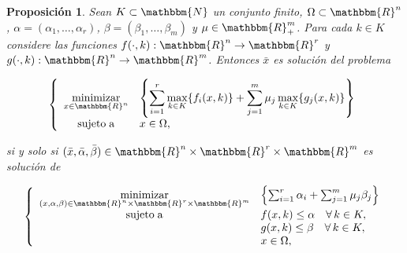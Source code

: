 \documentclass[a4paper,12pt]{report}
\newcommand{\RR}{\mathbbm{R}}
\newcommand{\NN}{\mathbbm{N}}
\newcommand{\Rn}{\RR^n}
\newcommand{\Rm}{\RR^m}
\newcommand{\bx}{\bar{x}}
\newcommand{\arr}{\rightarrow}
\newtheorem{prop}[teo]{Proposici\'on}
\begin{document}
\begin{prop}\label{propvar}
Sean $K\subset\NN$ un conjunto finito, $\Omega\subset\Rn$, $\alpha=(\alpha_1,\ldots,\alpha_r)$, $\beta=(\beta_1,\ldots,\beta_m)$ y $\mu\in\Rm_+$. Para cada $k\in K$ considere las funciones \linebreak $f(\cdot,k):\Rn\arr\RR^r$ y $g(\cdot,k):\Rn\arr\Rm$. Entonces $\bx$ es soluci\'on del problema


\begin{equation}\label{P1}
\left\{ 
\begin{array}{cl}
\displaystyle  \mathop{\mathrm{minimizar}}_{x\in\Rn}&\left\{\displaystyle{\sum_{i=1}^r\max_{k\in K}\{f_i(x,k)\}+\sum_{j=1}^m\mu_j\max_{k\in K}\{g_j(x,k)\}}\right\}\\
  \mathrm{sujeto\;a}& x\in\Omega,
 \end{array}
\right.
\end{equation}


si y solo si $(\bx,\bar{\alpha},\bar{\beta})\in\RR^n\times\RR^r\times\RR^m$ es soluci\'on de


\begin{equation}\label{P2}
\left\{
 \begin{array}{cl}
 \displaystyle\mathop{\mathrm{minimizar}}_{(x,\alpha,\beta)\in\Rn\times\RR^r\times\Rm} &\left\{\sum_{i=1}^r\alpha_i+\sum_{j=1}^m\mu_j\beta_j\right\}\\
  \mathrm{sujeto\;a}& f(x,k)\leq\alpha\quad\forall\,k\in K,\\
  	&	g(x,k)\leq \beta\quad\forall\,k\in K,\\
	&  x\in\Omega,
 \end{array}
\right.
\end{equation}


\end{prop}
\end{document}
